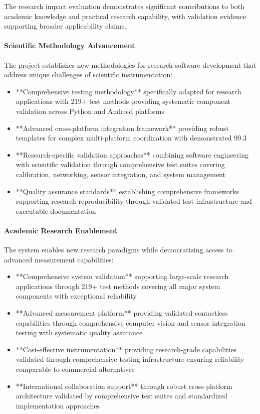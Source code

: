 \documentclass[12pt,a4paper]{article}
\begin{document}
The research impact evaluation demonstrates significant contributions to both academic knowledge and practical research
capability, with validation evidence supporting broader applicability claims.

\paragraph{Scientific Methodology Advancement}

The project establishes new methodologies for research software development that address unique challenges of scientific
instrumentation:

\begin{itemize}
\item **Comprehensive testing methodology** specifically adapted for research applications with 219+ test methods 
  providing systematic component validation across Python and Android platforms
\item **Advanced cross-platform integration framework** providing robust templates for complex multi-platform 
  coordination with demonstrated 99.3%
\item **Research-specific validation approaches** combining software engineering with scientific validation through 
  comprehensive test suites covering calibration, networking, sensor integration, and system management
\item **Quality assurance standards** establishing comprehensive frameworks supporting research reproducibility through 
  validated test infrastructure and executable documentation

\end{itemize}
\paragraph{Academic Research Enablement}

The system enables new research paradigms while democratizing access to advanced measurement capabilities:

\begin{itemize}
\item **Comprehensive system validation** supporting large-scale research applications through 219+ test methods 
  covering all major system components with exceptional reliability
\item **Advanced measurement platform** providing validated contactless capabilities through comprehensive computer 
  vision and sensor integration testing with systematic quality assurance
\item **Cost-effective instrumentation** providing research-grade capabilities validated through comprehensive testing 
  infrastructure ensuring reliability comparable to commercial alternatives
\item **International collaboration support** through robust cross-platform architecture validated by comprehensive 
  test suites and standardized implementation approaches

\end{itemize}
\end{document}
